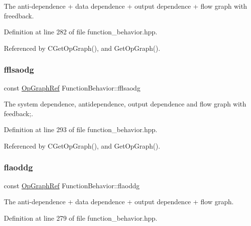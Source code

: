 The anti-\/dependence + data dependence + output dependence + flow graph with freedback. 



Definition at line 282 of file function\+\_\+behavior.\+hpp.



Referenced by C\+Get\+Op\+Graph(), and Get\+Op\+Graph().

\mbox{\label{classFunctionBehavior_a488c30f3e859890901121cc73115cfb2}} 
\subsubsection{\texorpdfstring{fflsaodg}{fflsaodg}}
{\footnotesize\ttfamily const \hyperlink{op__graph_8hpp_aee97c95c40f791b60c451d9e29c72d39}{Op\+Graph\+Ref} Function\+Behavior\+::fflsaodg\hspace{0.3cm}{\ttfamily [private]}}



The system dependence, antidependence, output dependence and flow graph with feedback;. 



Definition at line 293 of file function\+\_\+behavior.\+hpp.



Referenced by C\+Get\+Op\+Graph(), and Get\+Op\+Graph().

\mbox{\label{classFunctionBehavior_a89f7615ad27b5306f19daababca9c43a}} 
\subsubsection{\texorpdfstring{flaoddg}{flaoddg}}
{\footnotesize\ttfamily const \hyperlink{op__graph_8hpp_aee97c95c40f791b60c451d9e29c72d39}{Op\+Graph\+Ref} Function\+Behavior\+::flaoddg\hspace{0.3cm}{\ttfamily [private]}}



The anti-\/dependence + data dependence + output dependence + flow graph. 



Definition at line 279 of file function\+\_\+behavior.\+hpp.



